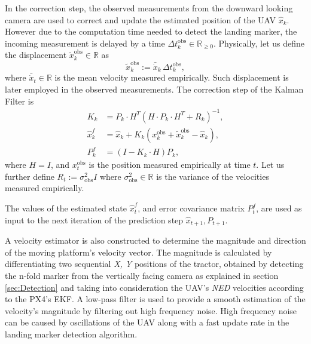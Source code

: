 \documentclass[conference, onecolumn, draftclsnofoot]{IEEEtran}
\begin{document}
In the correction step, the observed measurements from the downward
looking camera are used to correct and update the estimated
position of the UAV $\hat{x}_k$. However due to the computation time
needed to detect the landing marker, the incoming measurement is
delayed by a time \(\Delta t_k^{\text{obs}}\in\mathbb{R}_{\geq 0}\). Physically, let us define the displacement $\tilde{x}_k^{\text{obs}}\in\mathbb{R}$ as
\begin{equation}
  \tilde{x}_k^{\text{obs}}:=\bar{\dot{x}}_k\,\Delta t_k^{\text{obs}}, %
\end{equation}
where $\bar{\dot{x}}_t\in\mathbb{R}$ is the mean velocity measured empirically. Such displacement is later employed in the observed measurements. The correction step of the Kalman Filter is
\begin{subequations}
  \begin{align}
    K_{k} &= P_{k}\cdot H^T(H\cdot P_{k}\cdot H^T + R_{k})^{-1}, \\
    \hat{x}_{k}^f &= \hat{x}_{k} + K_{k}(x^{\text{obs}}_k+\tilde{x}^{\text{obs}}_k - \hat{x}_{k}), \\ %
    P_{k}^f &= (I - K_{k}\cdot H) P_{k},
  \end{align}
\end{subequations}
where $H=I$, and $x_t^{\text{obs}}$ is the position measured empirically at time $t$. Let us further define $R_t:=\sigma^{2}_{\text{obs}}I$ where $\sigma^{2}_{\text{obs}}\in\mathbb{R}$ is the variance of the velocities measured empirically. 

The values of the estimated state $\hat{x}_{t}^f$, and error covariance matrix $P_{t}^f$, are used as input to the next iteration of the prediction step $\hat{x}_{t+1},P_{t+1}$.

A velocity estimator is also constructed to determine the magnitude
and direction of the moving platform's velocity vector. 
The magnitude
is calculated by differentiating two sequential \emph{X, Y} positions 
of the tractor, obtained by detecting the n-fold marker from the 
vertically facing camera as explained in section \ref{sec:Detection}  
and taking into consideration the
UAV's \emph{NED} velocities according to the PX4's EKF. A low-pass
filter is used to provide a smooth estimation of the velocity's
magnitude by filtering out high frequency noise. High frequency noise
can be caused by oscillations of the UAV along with a fast update rate
in the landing marker detection algorithm.  %
\end{document}
